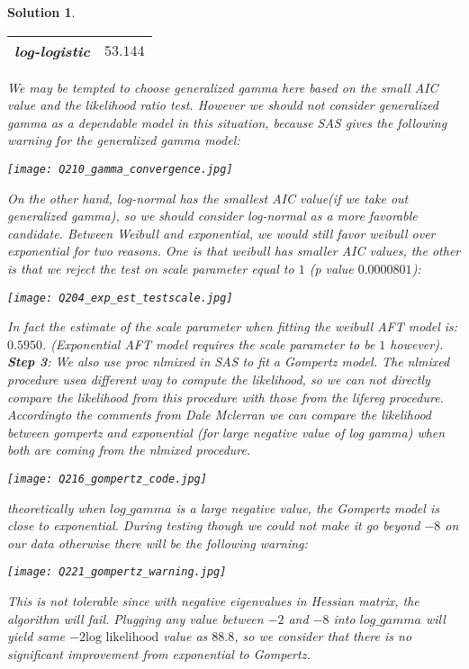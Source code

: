 \documentclass[11pt]{article}
\newtheorem{sol}{Solution}
\begin{document}
\begin{sol}
\begin{center}
\begin{tabular}{|c|c|}
		\hline
		log-logistic & $53.144$\\
		\hline
	\end{tabular}
	\end{center}
	\vskip 2mm	
	We may be tempted to choose generalized gamma here based on the small AIC value and the likelihood ratio test. However we should not consider generalized gamma as a dependable model in this situation, because SAS gives the following warning for the generalized gamma model:
	\begin{center}
		\texttt{[image: Q210\_gamma\_convergence.jpg]}
	\end{center}
	On the other hand, log-normal has the smallest AIC value(if we take out generalized gamma), so we should consider log-normal as a more favorable candidate.\vskip 2mm
	Between Weibull and exponential, we would still favor weibull over exponential for two reasons. One is that weibull has smaller AIC values, the other is that we reject the test on scale parameter equal to $1$ (p value $0.0000801$):
	\begin{center}
		\texttt{[image: Q204\_exp\_est\_testscale.jpg]}
	\end{center}
	In fact the estimate of the scale parameter when fitting the weibull AFT model is: $0.5950$. (Exponential AFT model requires the scale parameter to be $1$ however).\vskip 2mm
	{\bf Step 3}: We also use proc nlmixed in SAS to fit a Gompertz model. The nlmixed procedure usea different way to compute the likelihood, so we can not directly compare the likelihood from this procedure with those from the lifereg procedure. Accordingto the comments from Dale Mclerran we can compare the likelihood between gompertz and exponential (for large negative value of log gamma) when both are coming from the nlmixed procedure.\vskip 2mm
	\begin{center}
		\texttt{[image: Q216\_gompertz\_code.jpg]}
	\end{center}
	theoretically when $log\_gamma$ is a large negative value, the Gompertz model is close to exponential. During testing though we could not make it go beyond $-8$ on our data otherwise there will be the following warning:
	\begin{center}
		\texttt{[image: Q221\_gompertz\_warning.jpg]}
	\end{center}
	This is not tolerable since with negative eigenvalues in Hessian matrix, the algorithm will fail.\vskip 2mm
	Plugging any value between $-2$ and $-8$ into $log\_gamma$ will yield same $-2\text{log likelihood}$ value as $88.8$, so we consider that there is no significant improvement from exponential to Gompertz.\vskip 2mm

\end{sol}
\end{document}
